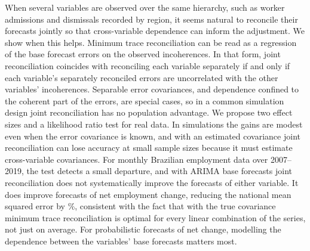 When several variables are observed over the same hierarchy, such as worker admissions and dismissals recorded by region, it seems natural to reconcile their forecasts jointly so that cross-variable dependence can inform the adjustment. We show when this helps. Minimum trace reconciliation can be read as a regression of the base forecast errors on the observed incoherences. In that form, joint reconciliation coincides with reconciling each variable separately if and only if each variable's separately reconciled errors are uncorrelated with the other variables' incoherences. Separable error covariances, and dependence confined to the coherent part of the errors, are special cases, so in a common simulation design joint reconciliation has no population advantage. We propose two effect sizes and a likelihood ratio test for real data. In simulations the gains are modest even when the error covariance is known, and with an estimated covariance joint reconciliation can lose accuracy at small sample sizes because it must estimate cross-variable covariances. For monthly Brazilian employment data over 2007--2019, the test detects a small departure, and with ARIMA base forecasts joint reconciliation does not systematically improve the forecasts of either variable. It does improve forecasts of net employment change, reducing the national mean squared error by \appNetPointTotal\%, consistent with the fact that with the true covariance minimum trace reconciliation is optimal for every linear combination of the series, not just on average. For probabilistic forecasts of net change, modelling the dependence between the variables' base forecasts matters most.
